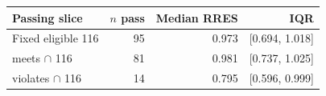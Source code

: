 \begin{tabular}{lrrr}
\toprule
\textbf{Passing slice} & \textbf{$n$ pass} & \textbf{Median RRES} & \textbf{IQR} \\
\midrule
Fixed eligible 116 & 95 & 0.973 & [0.694, 1.018] \\
meets $\cap$ 116 & 81 & 0.981 & [0.737, 1.025] \\
violates $\cap$ 116 & 14 & 0.795 & [0.596, 0.999] \\
\bottomrule
\end{tabular}
